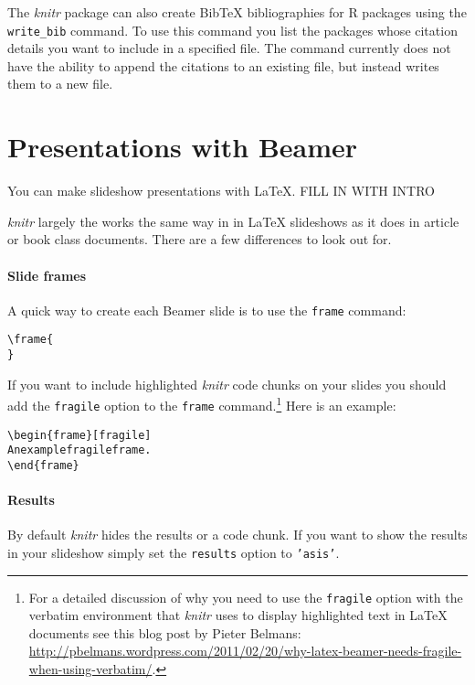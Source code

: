 The {\emph{knitr}} package can also create BibTeX bibliographies for R packages using the \texttt{write\_bib} command. To use this command you list the packages whose citation details you want to include in a specified file. The command currently does not have the ability to append the citations to an existing file, but instead writes them to a new file.

\section{Presentations with Beamer}

You can make slideshow presentations with LaTeX. FILL IN WITH INTRO

{\emph{knitr}} largely the works the same way in in LaTeX slideshows as it does in article or book class documents. There are a few differences to look out for. 

\paragraph{Slide frames}

A quick way to create each Beamer slide is to use the \texttt{frame} command:

\begin{knitrout}
\color{fgcolor}\begin{kframe}
\begin{alltt}
\textbackslash{}frame\{
\}
\end{alltt}
\end{kframe}
\end{knitrout}


\noindent If you want to include highlighted {\emph{knitr}} code chunks on your slides you should add the \texttt{fragile} option to the \texttt{frame} command.\footnote{For a detailed discussion of why you need to use the \texttt{fragile} option with the verbatim environment that {\emph{knitr}} uses to display highlighted text in LaTeX documents see this blog post by Pieter Belmans: \url{http://pbelmans.wordpress.com/2011/02/20/why-latex-beamer-needs-fragile-when-using-verbatim/}.} Here is an example:

\begin{knitrout}
\color{fgcolor}\begin{kframe}
\begin{alltt}
\textbackslash{}begin\{frame\}[fragile]
    An example fragile frame.
\textbackslash{}end\{frame\}
\end{alltt}
\end{kframe}
\end{knitrout}


\paragraph{Results}

By default {\emph{knitr}} hides the results or a code chunk. If you want to show the results in your slideshow simply set the {\tt{results}} option to {\tt{'asis'}}.
